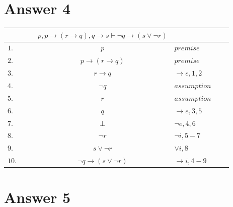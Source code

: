 \documentclass[12pt]{article}
\begin{document}
\section*{Answer 4}
\begin{table}[H]
    \centering
    \begin{tabular}{lllclrr}
        & & & $p, p \rightarrow (r \rightarrow q), q \rightarrow s \vdash \neg q \rightarrow (s \lor \neg r)$ & & & \\
        \hline
        \hline
        $1.$ & & & $p$ & $premise$ & & \\
        $2.$ & & & $p \rightarrow (r \rightarrow q)$ & $premise$ & & \\
        $3.$ & & & $r \rightarrow q$ & $\rightarrow e, 1,2$ & & \\
        \cline{2-7}
        $4.$ & \multicolumn{1}{|c}{} & & $\neg q$ & $assumption$ & & \multicolumn{1}{c|}{} \\
        \cline{3-6}
        $5.$ & \multicolumn{1}{|c}{} & \multicolumn{1}{|c}{} & $r$ & $assumption$ & \multicolumn{1}{c|}{} & \multicolumn{1}{c|}{} \\
        $6.$ & \multicolumn{1}{|c}{} & \multicolumn{1}{|c}{} & $q$ & $\rightarrow e, 3,5$ & \multicolumn{1}{c|}{} & \multicolumn{1}{c|}{} \\
        $7.$ & \multicolumn{1}{|c}{} & \multicolumn{1}{|c}{} & $\bot$ & $\neg e, 4,6$ & \multicolumn{1}{c|}{} & \multicolumn{1}{c|}{} \\
        \cline{3-6}
        $8.$ & \multicolumn{1}{|c}{} & & $\neg r$ & $\neg i, 5-7$ & & \multicolumn{1}{c|}{} \\
        $9.$ & \multicolumn{1}{|c}{} & & $s \lor \neg r$ & $\lor i, 8$ & & \multicolumn{1}{c|}{} \\
        \cline{2-7}
        $10.$ & & & $\neg q \rightarrow (s \lor \neg r)$ & $\rightarrow i, 4-9$ & &
    \end{tabular}
\end{table}


\section*{Answer 5}
\end{document}
